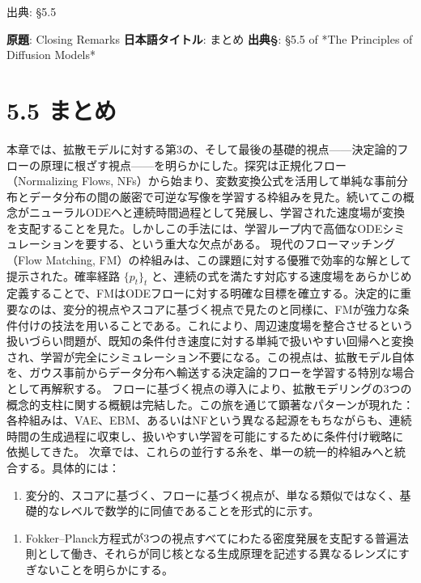 

{\color{gray}\footnotesize 出典: §5.5\par}
\vspace{0.2em}
\begin{propositionbox}[原題]
\textbf{原題}: Closing Remarks
\textbf{日本語タイトル}: まとめ
\textbf{出典§}: §5.5 of *The Principles of Diffusion Models*
\end{propositionbox}


\section*{5.5 まとめ}


本章では、拡散モデルに対する第3の、そして最後の基礎的視点——決定論的フローの原理に根ざす視点——を明らかにした。探究は正規化フロー（Normalizing Flows, NFs）から始まり、変数変換公式を活用して単純な事前分布とデータ分布の間の厳密で可逆な写像を学習する枠組みを見た。続いてこの概念がニューラルODEへと連続時間過程として発展し、学習された速度場が変換を支配することを見た。しかしこの手法には、学習ループ内で高価なODEシミュレーションを要する、という重大な欠点がある。
現代のフローマッチング（Flow Matching, FM）の枠組みは、この課題に対する優雅で効率的な解として提示された。確率経路 $\{p_t\}_t$ と、連続の式を満たす対応する速度場をあらかじめ定義することで、FMはODEフローに対する明確な目標を確立する。決定的に重要なのは、変分的視点やスコアに基づく視点で見たのと同様に、FMが強力な条件付けの技法を用いることである。これにより、周辺速度場を整合させるという扱いづらい問題が、既知の条件付き速度に対する単純で扱いやすい回帰へと変換され、学習が完全にシミュレーション不要になる。この視点は、拡散モデル自体を、ガウス事前からデータ分布へ輸送する決定論的フローを学習する特別な場合として再解釈する。
フローに基づく視点の導入により、拡散モデリングの3つの概念的支柱に関する概観は完結した。この旅を通じて顕著なパターンが現れた：各枠組みは、VAE、EBM、あるいはNFという異なる起源をもちながらも、連続時間の生成過程に収束し、扱いやすい学習を可能にするために条件付け戦略に依拠してきた。
次章では、これらの並行する糸を、単一の統一的枠組みへと統合する。具体的には：

\begin{enumerate}
\item 変分的、スコアに基づく、フローに基づく視点が、単なる類似ではなく、基礎的なレベルで数学的に同値であることを形式的に示す。
\end{enumerate}


\begin{enumerate}
\item Fokker–Planck方程式が3つの視点すべてにわたる密度発展を支配する普遍法則として働き、それらが同じ核となる生成原理を記述する異なるレンズにすぎないことを明らかにする。
\end{enumerate}


